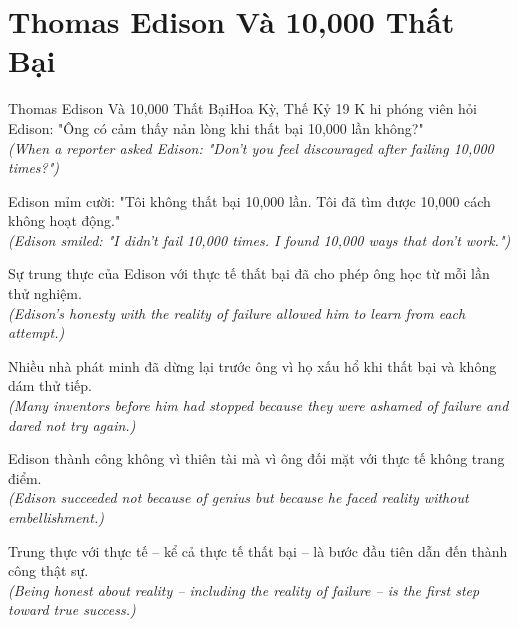 \section{Thomas Edison Và 10,000 Thất Bại}
\begin{truyen}{Thomas Edison Và 10,000 Thất Bại}{Hoa Kỳ, Thế Kỷ 19}
K hi phóng viên hỏi Edison: "Ông có cảm thấy nản lòng khi thất bại 10,000 lần không?"\\
\textit{(When a reporter asked Edison: "Don't you feel discouraged after failing 10,000 times?")}

Edison mỉm cười: "Tôi không thất bại 10,000 lần. Tôi đã tìm được 10,000 cách không hoạt động."\\
\textit{(Edison smiled: "I didn't fail 10,000 times. I found 10,000 ways that don't work.")}

Sự trung thực của Edison với thực tế thất bại đã cho phép ông học từ mỗi lần thử nghiệm.\\
\textit{(Edison's honesty with the reality of failure allowed him to learn from each attempt.)}

Nhiều nhà phát minh đã dừng lại trước ông vì họ xấu hổ khi thất bại và không dám thử tiếp.\\
\textit{(Many inventors before him had stopped because they were ashamed of failure and dared not try again.)}

Edison thành công không vì thiên tài mà vì ông đối mặt với thực tế không trang điểm.\\
\textit{(Edison succeeded not because of genius but because he faced reality without embellishment.)}

\end{truyen}
\begin{baihoc}
  Trung thực với thực tế -- kể cả thực tế thất bại -- là bước đầu tiên dẫn đến thành công thật sự.\\
  \textit{(Being honest about reality -- including the reality of failure -- is the first step toward true success.)}
\end{baihoc}

